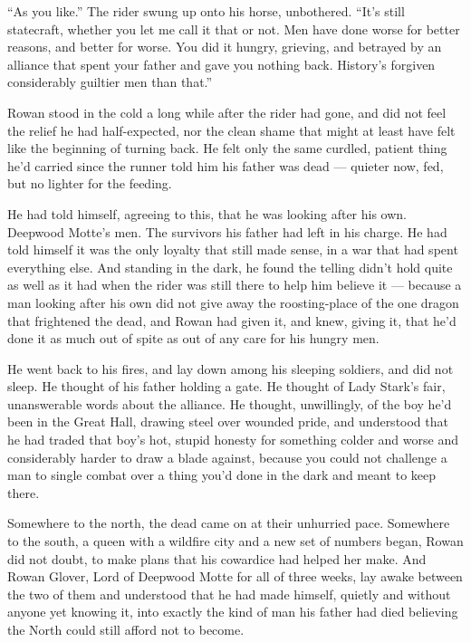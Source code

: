 “As you like.” The rider swung up onto his horse, unbothered. “It’s still statecraft, whether you let me call it that or not. Men have done worse for better reasons, and better for worse. You did it hungry, grieving, and betrayed by an alliance that spent your father and gave you nothing back. History’s forgiven considerably guiltier men than that.”

\sceneBreak

Rowan stood in the cold a long while after the rider had gone, and did not feel the relief he had half-expected, nor the clean shame that might at least have felt like the beginning of turning back. He felt only the same curdled, patient thing he’d carried since the runner told him his father was dead — quieter now, fed, but no lighter for the feeding.

He had told himself, agreeing to this, that he was looking after his own. Deepwood Motte’s men. The survivors his father had left in his charge. He had told himself it was the only loyalty that still made sense, in a war that had spent everything else. And standing in the dark, he found the telling didn’t hold quite as well as it had when the rider was still there to help him believe it — because a man looking after his own did not give away the roosting-place of the one dragon that frightened the dead, and Rowan had given it, and knew, giving it, that he’d done it as much out of spite as out of any care for his hungry men.

He went back to his fires, and lay down among his sleeping soldiers, and did not sleep. He thought of his father holding a gate. He thought of Lady Stark’s fair, unanswerable words about the alliance. He thought, unwillingly, of the boy he’d been in the Great Hall, drawing steel over wounded pride, and understood that he had traded that boy’s hot, stupid honesty for something colder and worse and considerably harder to draw a blade against, because you could not challenge a man to single combat over a thing you’d done in the dark and meant to keep there.

Somewhere to the north, the dead came on at their unhurried pace. Somewhere to the south, a queen with a wildfire city and a new set of numbers began, Rowan did not doubt, to make plans that his cowardice had helped her make. And Rowan Glover, Lord of Deepwood Motte for all of three weeks, lay awake between the two of them and understood that he had made himself, quietly and without anyone yet knowing it, into exactly the kind of man his father had died believing the North could still afford not to become.